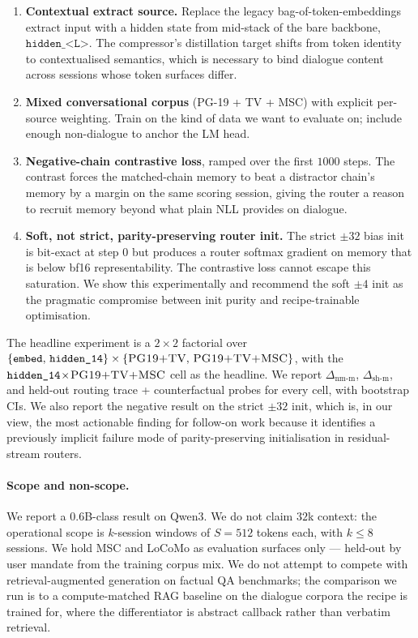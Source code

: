 \documentclass{article}
\newcommand{\dnm}{\Delta_{\text{nm-m}}}
\newcommand{\dsh}{\Delta_{\text{sh-m}}}
\begin{document}
\begin{enumerate}\setlength{\itemsep}{0pt}
\item \textbf{Contextual extract source.} Replace the legacy
bag-of-token-embeddings extract input with a hidden state from
mid-stack of the bare backbone, $\texttt{hidden\_<L>}$. The
compressor's distillation target shifts from token identity to
contextualised semantics, which is necessary to bind dialogue
content across sessions whose token surfaces differ.
\item \textbf{Mixed conversational corpus} (PG-19 + TV + MSC) with
explicit per-source weighting. Train on the kind of data we want
to evaluate on; include enough non-dialogue to anchor the LM head.
\item \textbf{Negative-chain contrastive loss}, ramped over the
first $1000$ steps. The contrast forces the matched-chain memory
to beat a distractor chain's memory by a margin on the same
scoring session, giving the router a reason to recruit memory
beyond what plain NLL provides on dialogue.
\item \textbf{Soft, not strict, parity-preserving router init.}
The strict $\pm 32$ bias init is bit-exact at step $0$ but produces
a router softmax gradient on memory that is below bf16
representability. The contrastive loss cannot escape this
saturation. We show this experimentally and recommend the soft
$\pm 4$ init as the pragmatic compromise between init purity and
recipe-trainable optimisation.
\end{enumerate}

The headline experiment is a $2\!\times\!2$ factorial over
$\{\texttt{embed},\,\texttt{hidden\_14}\}\times\{\textsc{PG19+TV},\,
\textsc{PG19+TV+MSC}\}$, with the $\texttt{hidden\_14}\!\times\!\textsc{PG19+TV+MSC}$
cell as the headline. We report $\dnm$, $\dsh$, and held-out routing
trace + counterfactual probes for every cell, with bootstrap CIs.
We also report the negative result on the strict $\pm 32$ init,
which is, in our view, the most actionable finding for follow-on
work because it identifies a previously implicit failure mode of
parity-preserving initialisation in residual-stream routers.

\paragraph{Scope and non-scope.} We report a $0.6$B-class result
on Qwen3. We do not claim $32$k context: the operational scope is
$k$-session windows of $S{=}512$ tokens each, with $k\!\le\!8$
sessions. We hold MSC and LoCoMo as evaluation surfaces only ---
held-out by user mandate from the training corpus mix. We do not
attempt to compete with retrieval-augmented generation on factual
$\mathrm{QA}$ benchmarks; the comparison we run is to a
compute-matched RAG baseline on the dialogue corpora the recipe is
trained for, where the differentiator is abstract callback rather
than verbatim retrieval.
\end{document}
